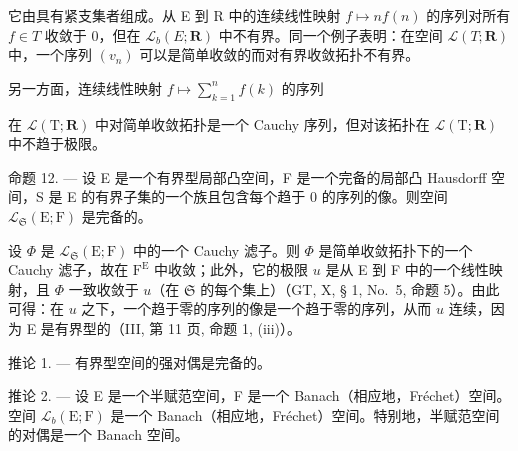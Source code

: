 它由具有紧支集者组成。从 E 到 R 中的连续线性映射 \(f \mapsto nf(n)\) 的序列对所有 \(f \in T\) 收敛于 0，但在 \(\mathcal{L}_{b}(E; \mathbf{R})\) 中不有界。同一个例子表明：在空间 \(\mathcal{L}(T; \mathbf{R})\) 中，一个序列 \((v_{n})\) 可以是简单收敛的而对有界收敛拓扑不有界。

另一方面，连续线性映射 \(f \mapsto \sum_{k=1}^{n} f(k)\) 的序列

在 \(\mathcal{L}(\mathrm{T};\mathbf{R})\) 中对简单收敛拓扑是一个 Cauchy 序列，但对该拓扑在 \(\mathcal{L}(\mathrm{T};\mathbf{R})\) 中不趋于极限。

命题 12. --- 设 E 是一个有界型局部凸空间，F 是一个完备的局部凸 Hausdorff 空间，S 是 E 的有界子集的一个族且包含每个趋于 0 的序列的像。则空间 \(\mathcal{L}_{\mathfrak{S}}(\mathrm{E};\mathrm{F})\) 是完备的。

设 \(\Phi\) 是 \(\mathcal{L}_{\mathfrak{S}}(\mathrm{E};\mathrm{F})\) 中的一个 Cauchy 滤子。则 \(\Phi\) 是简单收敛拓扑下的一个 Cauchy 滤子，故在 \(\mathrm{F}^{\mathrm{E}}\) 中收敛；此外，它的极限 \(u\) 是从 E 到 F 中的一个线性映射，且 \(\Phi\) 一致收敛于 \(u\)（在 \(\mathfrak{S}\) 的每个集上）（GT, X, § 1, No.~5, 命题 5）。由此可得：在 \(u\) 之下，一个趋于零的序列的像是一个趋于零的序列，从而 \(u\) 连续，因为 E 是有界型的（III, 第 11 页, 命题 1, (iii)）。

推论 1. --- 有界型空间的强对偶是完备的。

推论 2. --- 设 E 是一个半赋范空间，F 是一个 Banach（相应地，Fréchet）空间。空间 \(\mathcal{L}_{b}(\mathrm{E};\mathrm{F})\) 是一个 Banach（相应地，Fréchet）空间。特别地，半赋范空间的对偶是一个 Banach 空间。


